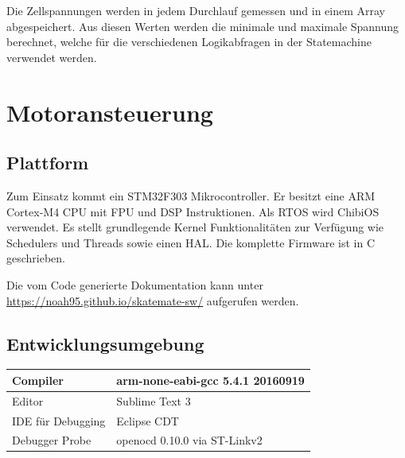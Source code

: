 Die Zellspannungen werden in jedem Durchlauf gemessen und in einem Array abgespeichert. Aus diesen Werten werden die minimale und maximale Spannung berechnet, welche für die verschiedenen Logikabfragen in der Statemachine verwendet werden.

\section{Motoransteuerung} \label{SW_Motoransteuerung}
\subsection*{Plattform}
Zum Einsatz kommt ein STM32F303 Mikrocontroller. Er besitzt eine ARM Cortex-M4 CPU mit FPU und DSP Instruktionen. Als RTOS wird ChibiOS verwendet. Es stellt grundlegende Kernel Funktionalitäten zur Verfügung wie Schedulers und Threads sowie einen HAL. Die komplette Firmware ist in C geschrieben.

Die vom Code generierte Dokumentation kann unter \url{https://noah95.github.io/skatemate-sw/} aufgerufen werden.
\subsection*{Entwicklungsumgebung}
\begin{center}
	\begin{tabular}{ | l | l | }
		\hline
		Compiler & arm-none-eabi-gcc 5.4.1 20160919 \\ \hline
		Editor & Sublime Text 3 \\ \hline
		IDE für Debugging & Eclipse CDT \\ \hline
		Debugger Probe & openocd 0.10.0 via ST-Linkv2 \\ \hline
	\end{tabular}
\end{center}


